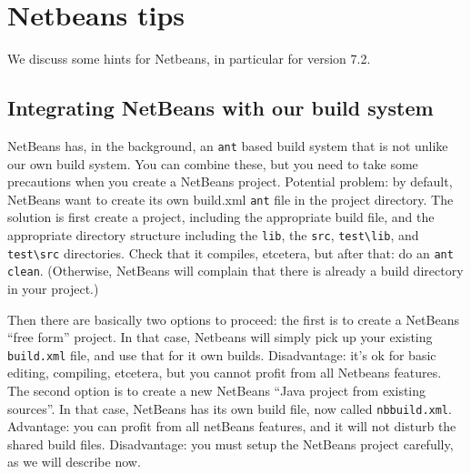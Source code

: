 \section{Netbeans tips}

We discuss some hints for Netbeans, in particular for version 7.2.

\subsection{Integrating NetBeans with our build system}

NetBeans has, in the background, an \verb#ant# based build system that is not unlike our own
build system. You can combine these, but you need to take some precautions when you create a NetBeans project.
Potential problem: by default, NetBeans want to create its own build.xml \verb#ant# file in the
project directory.
The solution is first create a project, including the appropriate build file, and the appropriate directory
structure including the \verb#lib#, the \verb#src#, \verb#test\lib#, and \verb#test\src# directories.
Check that it compiles, etcetera, but after that: do an \verb#ant clean#.
(Otherwise, NetBeans will complain that there is already a build directory in your project.)

Then there are basically two options to proceed: the first is to create a
NetBeans ``free form'' project.
In that case, Netbeans will simply pick up your existing \verb#build.xml# file, and use that
for it own builds. Disadvantage: it's ok for basic editing, compiling, etcetera,
but you cannot profit from all Netbeans features.
The second option is to create a new NetBeans ``Java project from existing sources''.
In that case, NetBeans has its own build file, now called \verb#nbbuild.xml#.
Advantage: you can profit from all netBeans features, and it will not disturb the shared
build files. Disadvantage: you must setup the NetBeans project carefully, as we will describe now.

